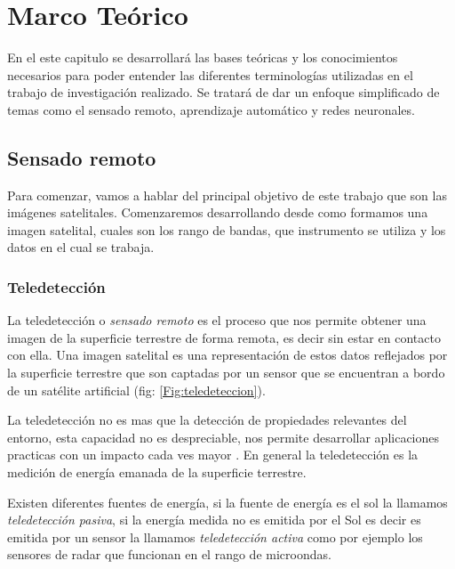 \chapter{Marco Teórico} \label{chap:marcoteorico}

En el este capitulo se desarrollará las bases teóricas y los conocimientos necesarios para poder entender las diferentes terminologías utilizadas en el trabajo de investigación realizado. Se tratará de dar un enfoque simplificado de temas como el sensado remoto,  aprendizaje automático y redes neuronales.

\section{Sensado remoto}\label{sec:sensadoremoto}

Para comenzar, vamos a hablar del principal objetivo de este trabajo que son las imágenes satelitales. Comenzaremos desarrollando desde como formamos una imagen satelital, cuales son los rango de bandas, que instrumento se utiliza y los datos en el cual se trabaja.

\subsection{Teledetección}\label{sub:teledeteccion}

La teledetección o \textit{sensado remoto} es el proceso que nos permite obtener una imagen de la superficie terrestre de forma remota, es decir sin estar en contacto con ella. Una imagen satelital es una representación de estos datos reflejados por la superficie terrestre que son captadas por un sensor que se encuentran a bordo de un satélite artificial (fig: \ref{Fig:teledeteccion}).

La teledetección no es mas que la detección de propiedades relevantes del entorno, esta capacidad no es despreciable, nos permite desarrollar aplicaciones practicas con un impacto cada ves mayor \citep{percepcion}. En general la teledetección es la medición de energía emanada de la superficie terrestre. 

Existen diferentes fuentes de energía, si la fuente de energía es el sol la llamamos \textit{teledetección pasiva}, si la energía medida no es emitida por el Sol es decir es emitida por un sensor la llamamos \textit{teledetección activa} como por ejemplo los sensores de radar que funcionan en el rango de microondas.

